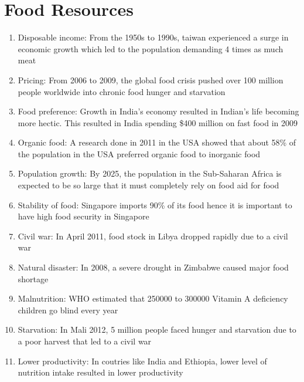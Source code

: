 \documentclass[oneside]{book}
\begin{document}
\newpage
\normalsize
\chapter{Food Resources} \small
\begin{minipage}{0.5\textwidth} 
  \begin{enumerate}
    \item Disposable income: From the 1950s to 1990s, taiwan experienced a surge in economic growth which led to the population demanding 4 times as much meat

    \item Pricing: From 2006 to 2009, the global food crisis pushed over 100 million people worldwide into chronic food hunger and starvation
    
    \item Food preference: Growth in India’s economy resulted in Indian’s life becoming more hectic. This resulted in India spending \$400 million on fast food in 2009
    
    \item Organic food: A research done in 2011 in the USA showed that about 58\% of the population in the USA preferred organic food to inorganic food
    
    \item Population growth: By 2025, the population in the Sub-Saharan Africa is expected to be so large that it must completely rely on food aid for food
    
    \item Stability of food: Singapore imports 90\% of its food hence it is important to have high food security in Singapore
    
    \item Civil war: In April 2011, food stock in Libya dropped rapidly due to a civil war
    
    \item Natural disaster: In 2008, a severe drought in Zimbabwe caused major food shortage
    
    \item Malnutrition: WHO estimated that 250000 to 300000 Vitamin A deficiency children go blind every year
    
    \item Starvation: In Mali 2012, 5 million people faced hunger and starvation due to a poor harvest that led to a civil war
    
    \item Lower productivity: In coutries like India and Ethiopia, lower level of nutrition intake resulted in lower productivity
    

\end{enumerate}
\end{minipage}
\end{document}
